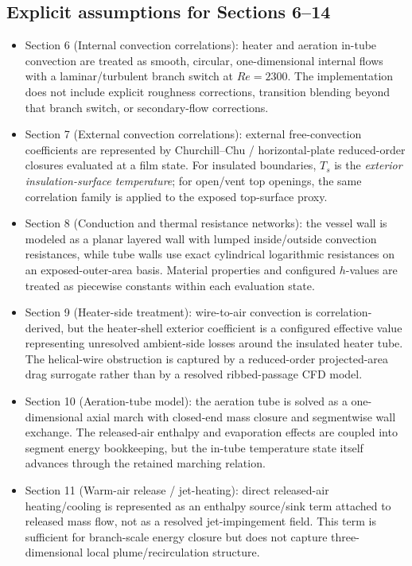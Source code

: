 \documentclass[11pt]{article}
\begin{document}
\subsection{Explicit assumptions for Sections 6--14}
\begin{itemize}[leftmargin=*]
\item Section 6 (Internal convection correlations): heater and aeration in-tube convection are treated as smooth, circular, one-dimensional internal flows with a laminar/turbulent branch switch at \(Re=2300\). The implementation does not include explicit roughness corrections, transition blending beyond that branch switch, or secondary-flow corrections.
\item Section 7 (External convection correlations): external free-convection coefficients are represented by Churchill--Chu / horizontal-plate reduced-order closures evaluated at a film state. For insulated boundaries, \(T_s\) is the \emph{exterior insulation-surface temperature}; for open/vent top openings, the same correlation family is applied to the exposed top-surface proxy.
\item Section 8 (Conduction and thermal resistance networks): the vessel wall is modeled as a planar layered wall with lumped inside/outside convection resistances, while tube walls use exact cylindrical logarithmic resistances on an exposed-outer-area basis. Material properties and configured \(h\)-values are treated as piecewise constants within each evaluation state.
\item Section 9 (Heater-side treatment): wire-to-air convection is correlation-derived, but the heater-shell exterior coefficient is a configured effective value representing unresolved ambient-side losses around the insulated heater tube. The helical-wire obstruction is captured by a reduced-order projected-area drag surrogate rather than by a resolved ribbed-passage CFD model.
\item Section 10 (Aeration-tube model): the aeration tube is solved as a one-dimensional axial march with closed-end mass closure and segmentwise wall exchange. The released-air enthalpy and evaporation effects are coupled into segment energy bookkeeping, but the in-tube temperature state itself advances through the retained marching relation.
\item Section 11 (Warm-air release / jet-heating): direct released-air heating/cooling is represented as an enthalpy source/sink term attached to released mass flow, not as a resolved jet-impingement field. This term is sufficient for branch-scale energy closure but does not capture three-dimensional local plume/recirculation structure.

\end{itemize}
\end{document}
